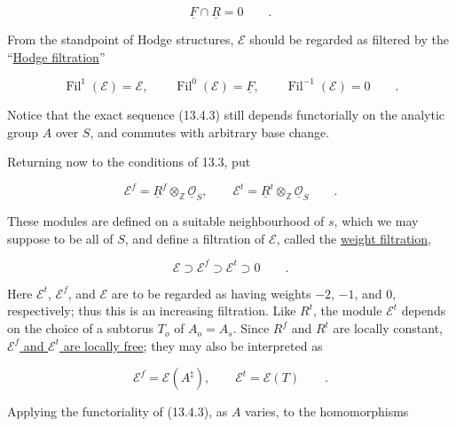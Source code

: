 \begin{equation}\tag{13.4.5}
 \underline F\cap\underline R=0\qquad .
\end{equation}

\noindent
From the standpoint of Hodge structures, $\mathcal E$ should be regarded
as filtered by the ``\underline{Hodge filtration}''

\begin{equation}\tag{13.4.6}
 \operatorname{Fil}^{1}(\mathcal E)=\mathcal E,
 \qquad \operatorname{Fil}^{0}(\mathcal E)=\underline F,
 \qquad \operatorname{Fil}^{-1}(\mathcal E)=0\qquad .
\end{equation}

\noindent
Notice that the exact sequence (13.4.3) still depends functorially on the
analytic group $A$ over $S$, and commutes with arbitrary base change.

Returning now to the conditions of 13.3, put

\begin{equation}\tag{13.4.7}
 \mathcal E^f=\underline R^f\otimes_{\mathbb Z}
 \underline{\mathcal O}_S,
 \qquad
 \mathcal E^t=\underline R^t\otimes_{\mathbb Z}
 \underline{\mathcal O}_S\qquad .
\end{equation}

\noindent
These modules are defined on a suitable neighbourhood of $s$, which we
may suppose to be all of $S$, and define a filtration of $\mathcal E$,
called the \underline{weight filtration},

\begin{equation}\tag{13.4.8}
 \mathcal E\supset\mathcal E^f\supset\mathcal E^t\supset0\qquad .
\end{equation}

\noindent
Here $\mathcal E^t$, $\mathcal E^f$, and $\mathcal E$ are to be regarded
as having weights $-2$, $-1$, and $0$, respectively; thus this is an
increasing filtration.  Like $R^t$, the module $\mathcal E^t$ depends on
the choice of a subtorus $T_o$ of $A_o=A_s$.  Since $R^f$ and $R^t$ are
locally constant, \underline{$\mathcal E^f$ and $\mathcal E^t$ are
locally free}; they may also be interpreted as

\begin{equation}\tag{13.4.9}
 \mathcal E^f=\mathcal E(A^\natural),
 \qquad \mathcal E^t=\mathcal E(T)\qquad .
\end{equation}

\noindent
Applying the functoriality of (13.4.3), as $A$ varies, to the
homomorphisms

